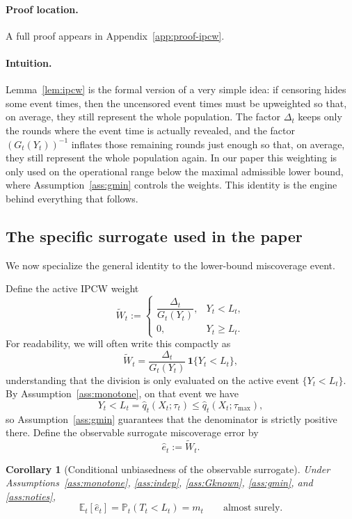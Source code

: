 \documentclass[11pt]{article}
\newtheorem{corollary}{Corollary}
\newcommand{\E}{\mathbb{E}}
\newcommand{\Prob}{\mathbb{P}}
\newcommand{\1}{\mathbf{1}}
\begin{document}
\paragraph{Proof location.} A full proof appears in Appendix~\ref{app:proof-ipcw}.


\paragraph{Intuition.} Lemma~\ref{lem:ipcw} is the formal version of a very simple idea: if censoring hides some event times, then the uncensored event times must be upweighted so that, on average, they still represent the whole population. The factor $\Delta_t$ keeps only the rounds where the event time is actually revealed, and the factor $(G_t(Y_t))^{-1}$ inflates those remaining rounds just enough so that, on average, they still represent the whole population again. In our paper this weighting is only used on the operational range below the maximal admissible lower bound, where Assumption~\ref{ass:gmin} controls the weights. This identity is the engine behind everything that follows.


\subsection{The specific surrogate used in the paper}

We now specialize the general identity to the lower-bound miscoverage event.

Define the active IPCW weight
\[
\widetilde W_t:=
\begin{cases}
\dfrac{\Delta_t}{G_t(Y_t)}, & Y_t<L_t,\\[1ex]
0, & Y_t\ge L_t.
\end{cases}
\]
For readability, we will often write this compactly as
\[
\widetilde W_t=\frac{\Delta_t}{G_t(Y_t)}\,\1\{Y_t<L_t\},
\]
understanding that the division is only evaluated on the active event $\{Y_t<L_t\}$. By Assumption~\ref{ass:monotone}, on that event we have
\[
Y_t<L_t=\hat q_t(X_t;\tau_t)\le \hat q_t(X_t;\tau_{\max}),
\]
so Assumption~\ref{ass:gmin} guarantees that the denominator is strictly positive there.
Define the observable surrogate miscoverage error by
\[
\hat e_t:=\widetilde W_t.
\]

\begin{corollary}[Conditional unbiasedness of the observable surrogate]
\label{cor:unbiased}
Under Assumptions~\ref{ass:monotone}, \ref{ass:indep}, \ref{ass:Gknown}, \ref{ass:gmin}, and \ref{ass:noties},
\[
\E_t[\hat e_t]=\Prob_t(T_t< L_t)=m_t
\qquad\text{almost surely.}
\]
\end{corollary}
\end{document}
